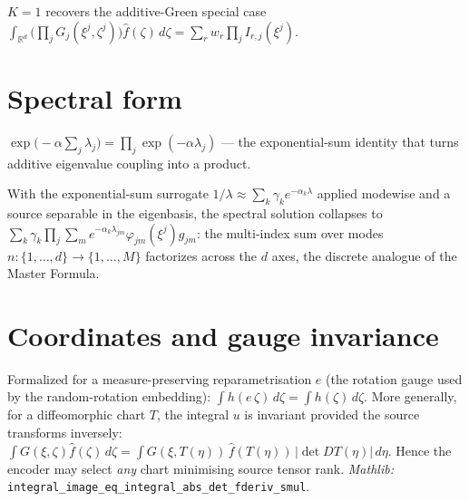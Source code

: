 \begin{corollary}[Additive Green as $K=1$]\label{cor:additive}
  \leanok{}
  $K=1$ recovers the additive-Green special case
  $\int_{\mathbb R^d}\big(\prod_j G_j(\xi^j,\zeta^j)\big)\hat f(\zeta)\,d\zeta
     =\sum_r w_r\prod_j I_{r,j}(\xi^j)$.
\end{corollary}

\section{Spectral form}

\begin{theorem}\label{thm:exp-neg-sum}
  \leanok
  $\displaystyle \exp\!\Big(-\alpha\sum_{j}\lambda_j\Big)=\prod_{j}\exp(-\alpha\lambda_j)$ — the
  exponential-sum identity that turns additive eigenvalue coupling into a product.
\end{theorem}

\begin{theorem}\label{thm:spectral-factor}
  \leanok{}
  With the exponential-sum surrogate $1/\lambda\approx\sum_k\gamma_k e^{-\alpha_k\lambda}$ applied
  modewise and a source separable in the eigenbasis, the spectral solution collapses to
  $\displaystyle \sum_k\gamma_k\prod_j\sum_m e^{-\alpha_k\lambda_{jm}}\varphi_{jm}(\xi^j)g_{jm}$:
  the multi-index sum over modes $n:\{1,\dots,d\}\to\{1,\dots,M\}$ factorizes across the $d$ axes,
  the discrete analogue of the Master Formula.
\end{theorem}

\section{Coordinates and gauge invariance}

\begin{theorem}\label{thm:gauge}
  \leanok
  Formalized for a measure-preserving reparametrisation $e$ (the rotation gauge used by the
  random-rotation embedding): $\int h(e\,\zeta)\,d\zeta=\int h(\zeta)\,d\zeta$.
  More generally, for a diffeomorphic chart $T$, the integral $u$ is invariant provided the
  source transforms inversely:
  $\int G(\xi,\zeta)\hat f(\zeta)\,d\zeta=\int G(\xi,T(\eta))\,\hat f(T(\eta))\,|\det DT(\eta)|\,d\eta$.
  Hence the encoder may select \emph{any} chart minimising source tensor rank.
  \emph{Mathlib:} \texttt{integral\_image\_eq\_integral\_abs\_det\_fderiv\_smul}.
\end{theorem}

